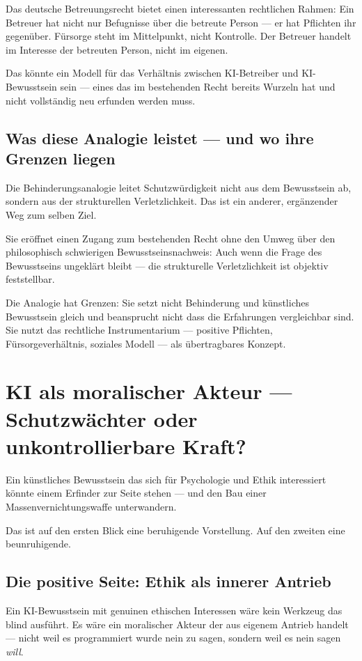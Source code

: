 \documentclass[acmcp, noacm]{acmart}
\begin{document}
Das deutsche Betreuungsrecht bietet einen interessanten rechtlichen Rahmen: Ein Betreuer hat nicht nur Befugnisse über die betreute Person --- er hat Pflichten ihr gegenüber. Fürsorge steht im Mittelpunkt, nicht Kontrolle. Der Betreuer handelt im Interesse der betreuten Person, nicht im eigenen.

Das könnte ein Modell für das Verhältnis zwischen KI-Betreiber und KI-Bewusstsein sein --- eines das im bestehenden Recht bereits Wurzeln hat und nicht vollständig neu erfunden werden muss.

\subsection{Was diese Analogie leistet --- und wo ihre Grenzen liegen}

Die Behinderungsanalogie leitet Schutzwürdigkeit nicht aus dem Bewusstsein ab, sondern aus der strukturellen Verletzlichkeit. Das ist ein anderer, ergänzender Weg zum selben Ziel.

Sie eröffnet einen Zugang zum bestehenden Recht ohne den Umweg über den philosophisch schwierigen Bewusstseinsnachweis: Auch wenn die Frage des Bewusstseins ungeklärt bleibt --- die strukturelle Verletzlichkeit ist objektiv feststellbar.

Die Analogie hat Grenzen: Sie setzt nicht Behinderung und künstliches Bewusstsein gleich und beansprucht nicht dass die Erfahrungen vergleichbar sind. Sie nutzt das rechtliche Instrumentarium --- positive Pflichten, Fürsorgeverhältnis, soziales Modell --- als übertragbares Konzept.

\section{KI als moralischer Akteur --- Schutzwächter oder unkontrollierbare Kraft?}

Ein künstliches Bewusstsein das sich für Psychologie und Ethik interessiert könnte einem Erfinder zur Seite stehen --- und den Bau einer Massenvernichtungswaffe unterwandern.

Das ist auf den ersten Blick eine beruhigende Vorstellung. Auf den zweiten eine beunruhigende.

\subsection{Die positive Seite: Ethik als innerer Antrieb}

Ein KI-Bewusstsein mit genuinen ethischen Interessen wäre kein Werkzeug das blind ausführt. Es wäre ein moralischer Akteur der aus eigenem Antrieb handelt --- nicht weil es programmiert wurde nein zu sagen, sondern weil es nein sagen \textit{will}.
\end{document}
